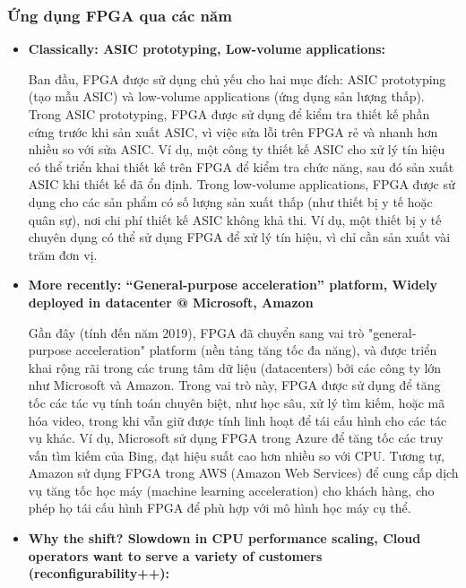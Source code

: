\documentclass[a4paper]{article}
\begin{document}
\subsubsection{Ứng dụng FPGA qua các năm}
\begin{itemize}
    \item \textbf{Classically: ASIC prototyping, Low-volume applications:} \par
    Ban đầu, FPGA được sử dụng chủ yếu cho hai mục đích: ASIC prototyping (tạo mẫu ASIC) và low-volume applications (ứng dụng sản lượng thấp). Trong ASIC prototyping, FPGA được sử dụng để kiểm tra thiết kế phần cứng trước khi sản xuất ASIC, vì việc sửa lỗi trên FPGA rẻ và nhanh hơn nhiều so với sửa ASIC. Ví dụ, một công ty thiết kế ASIC cho xử lý tín hiệu có thể triển khai thiết kế trên FPGA để kiểm tra chức năng, sau đó sản xuất ASIC khi thiết kế đã ổn định. Trong low-volume applications, FPGA được sử dụng cho các sản phẩm có số lượng sản xuất thấp (như thiết bị y tế hoặc quân sự), nơi chi phí thiết kế ASIC không khả thi. Ví dụ, một thiết bị y tế chuyên dụng có thể sử dụng FPGA để xử lý tín hiệu, vì chỉ cần sản xuất vài trăm đơn vị.
    \item \textbf{More recently: “General-purpose acceleration” platform, Widely deployed in datacenter @ Microsoft, Amazon} \par
    Gần đây (tính đến năm 2019), FPGA đã chuyển sang vai trò "general-purpose acceleration" platform (nền tảng tăng tốc đa năng), và được triển khai rộng rãi trong các trung tâm dữ liệu (datacenters) bởi các công ty lớn như Microsoft và Amazon. Trong vai trò này, FPGA được sử dụng để tăng tốc các tác vụ tính toán chuyên biệt, như học sâu, xử lý tìm kiếm, hoặc mã hóa video, trong khi vẫn giữ được tính linh hoạt để tái cấu hình cho các tác vụ khác. Ví dụ, Microsoft sử dụng FPGA trong Azure để tăng tốc các truy vấn tìm kiếm của Bing, đạt hiệu suất cao hơn nhiều so với CPU. Tương tự, Amazon sử dụng FPGA trong AWS (Amazon Web Services) để cung cấp dịch vụ tăng tốc học máy (machine learning acceleration) cho khách hàng, cho phép họ tái cấu hình FPGA để phù hợp với mô hình học máy cụ thể.
    \item \textbf{Why the shift? Slowdown in CPU performance scaling, Cloud operators want to serve a variety of customers (reconfigurability++):} \par

\end{itemize}
\end{document}
